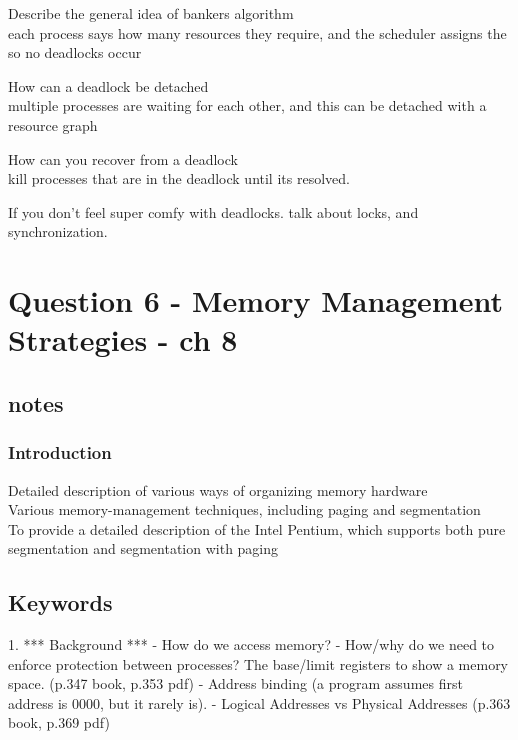 \documentclass[a4paper,10pt,titlepage]{report}
\begin{document}
Describe the general idea of bankers algorithm \\
\hspace{10mm} each process says how many resources they require, and the scheduler assigns the so no deadlocks occur\\
\vspace{5mm}

How can a deadlock be detached \\
\hspace{10mm} multiple processes are waiting for each other, and this can be detached with a resource graph \\
\vspace{5mm}

How can you recover from a deadlock\\
\hspace{10mm} kill processes that are in the deadlock until its resolved. \\
\vspace{5mm}



If you don't feel super comfy with deadlocks. talk about locks, and synchronization.
\newpage




\newpage
\section{Question 6 - Memory Management Strategies - ch 8}
\subsection{notes}
\subsubsection{Introduction}
Detailed description of various ways of organizing memory hardware\\
Various memory-management techniques, including paging and segmentation \\
To provide a detailed description of the Intel Pentium, which supports both pure segmentation and
segmentation with paging \\


\subsection{Keywords}


	1. *** Background ***
		- How do we access memory?
		- How/why do we need to enforce protection between processes? 	The base/limit registers to show a memory space. (p.347 book, p.353 pdf)
		- Address binding (a program assumes first address is 0000, but it rarely is).
		- Logical Addresses vs Physical Addresses (p.363 book, p.369 pdf)
		
\end{document}
